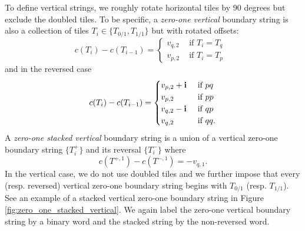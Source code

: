 \documentclass[12pt]{amsart}
\begin{document}
To define vertical strings, we roughly rotate horizontal tiles by 90 degrees but exclude the doubled tiles. To be specific, 
a {\it zero-one vertical} boundary string is also a collection of tiles $T_i \in \{T_{0/1}, T_{1/1}\}$ 
but with rotated offsets: 
\begin{equation} \label{eq:zero-one-bs-vertical}
c(T_i) - c(T_{i-1}) = \begin{cases}
v_{q,2} &\mbox{ if $T_i=T_q$ } \\%
v_{p,2} &\mbox{ if $T_i = T_p$} %
\end{cases}
\end{equation}
and in the reversed case 
\begin{equation} \label{eq:zero-one-bs-reversed-vertical}
c(T_i) - c(T_{i-1}) = \begin{cases}
v_{p,2}+ \mathbf{i} &\mbox{ if $pq$} \\
v_{p,2} &\mbox{ if $pp$} \\
v_{q,2}-\mathbf{i} &\mbox{ if $qp$} \\
v_{q,2} &\mbox{ if $qq$}.
\end{cases}
\end{equation}
A {\it zero-one stacked vertical} boundary string is a union of a vertical zero-one boundary string $\{T_i^+\}$ and its reversal $\{T_i^-\}$ where
\begin{equation}\label{eq:stacked_boundary_string_even_odd_vertical}
c(T^{+,1}) - c(T^{-,1}) = -v_{q,1}.
\end{equation}
In the vertical case, we do not use doubled tiles and we further impose that every (resp. reversed) vertical zero-one boundary string begins with $T_{0/1}$ (resp. $T_{1/1}$).  See an example of a stacked vertical zero-one boundary string in 
Figure \ref{fig:zero_one_stacked_vertical}. We again label the zero-one vertical boundary string by a binary word and the stacked string by the non-reversed word.
\end{document}
